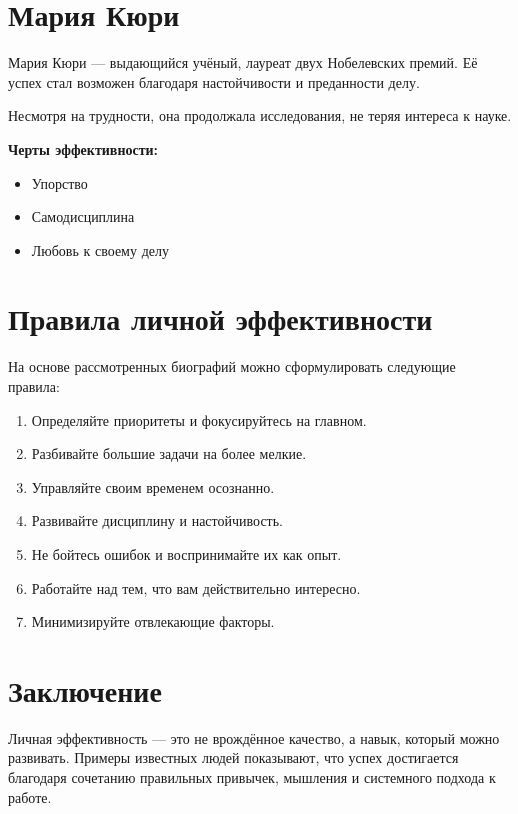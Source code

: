 \documentclass[12pt,a4paper]{article}
\begin{document}
\section{Мария Кюри}

Мария Кюри — выдающийся учёный, лауреат двух Нобелевских премий. Её успех стал возможен благодаря настойчивости и преданности делу.

Несмотря на трудности, она продолжала исследования, не теряя интереса к науке.

\textbf{Черты эффективности:}
\begin{itemize}
\item Упорство
\item Самодисциплина
\item Любовь к своему делу
\end{itemize}

\section*{Правила личной эффективности}

На основе рассмотренных биографий можно сформулировать следующие правила:

\begin{enumerate}
\item Определяйте приоритеты и фокусируйтесь на главном.
\item Разбивайте большие задачи на более мелкие.
\item Управляйте своим временем осознанно.
\item Развивайте дисциплину и настойчивость.
\item Не бойтесь ошибок и воспринимайте их как опыт.
\item Работайте над тем, что вам действительно интересно.
\item Минимизируйте отвлекающие факторы.
\end{enumerate}

\section*{Заключение}

Личная эффективность — это не врождённое качество, а навык, который можно развивать. Примеры известных людей показывают, что успех достигается благодаря сочетанию правильных привычек, мышления и системного подхода к работе.
\end{document}

